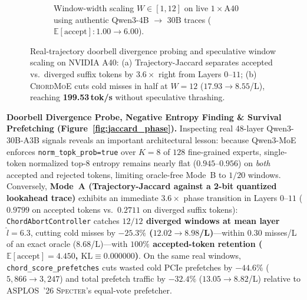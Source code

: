 \documentclass[10pt,twocolumn]{article}
\theoremstyle{definition}
\begin{document}
\begin{figure}[t]
\begin{subfigure}[t]{0.48\textwidth}
    \caption{Window-width scaling $W \in [1, 12]$ on live $1\times\text{A40}$ using authentic Qwen3-4B $\to$ 30B traces ($\mathbb{E}[\text{accept}]: 1.00 \to 6.00$).}
    \label{fig:window_scaling}
  \end{subfigure}
  \vspace{-4pt}
  \caption{Real-trajectory doorbell divergence probing and speculative window scaling on NVIDIA A40: (a) Trajectory-Jaccard separates accepted vs.\ diverged suffix tokens by $3.6\times$ right from Layers $0\text{--}11$; (b) \textsc{ChordMoE} cuts cold misses in half at $W=12$ ($17.93 \to 8.55$/L), reaching \textbf{199.53\,tok/s} without speculative thrashing.}
  \label{fig:probe_and_width}
\end{figure}

\vspace{2pt}
\noindent\textbf{Doorbell Divergence Probe, Negative Entropy Finding \& Survival Prefetching (Figure~\ref{fig:jaccard_phase}).}
Inspecting real 48-layer Qwen3-30B-A3B signals reveals an important architectural lesson: because Qwen3-MoE enforces \texttt{norm\_topk\_prob=true} over $K=8$ of $128$ fine-grained experts, single-token normalized top-$8$ entropy remains nearly flat ($0.945\text{--}0.956$) on \emph{both} accepted and rejected tokens, limiting oracle-free Mode~B to $1/20$ windows. Conversely, \textbf{Mode~A (Trajectory-Jaccard against a 2-bit quantized lookahead trace)} exhibits an immediate $3.6\times$ phase transition in Layers $0\text{--}11$ ($0.9799$ on accepted tokens vs.\ $0.2711$ on diverged suffix tokens): \texttt{ChordAbortController} catches \textbf{$12/12$ diverged windows at mean layer $\hat{l}=6.3$}, cutting cold misses by \textbf{$-25.3\%$ ($12.02 \to 8.98$/L)}—within $0.30$ misses/L of an exact oracle ($8.68$/L)—with \textbf{$100\%$ accepted-token retention ($\mathbb{E}[\text{accept}] = 4.450$, $\mathrm{KL} \equiv 0.000000$)}. On the same real windows, \texttt{chord\_score\_prefetches} cuts wasted cold PCIe prefetches by \textbf{$-44.6\%$} ($5,866 \to 3,247$) and total prefetch traffic by $-32.4\%$ ($13.05 \to 8.82$/L) relative to ASPLOS~'26 \textsc{Specter}'s equal-vote prefetcher.
\end{document}
